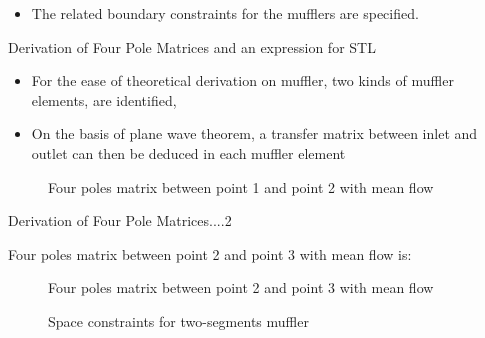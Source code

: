\documentclass{beamer}
\begin{document}
\begin{frame}{}

\begin{itemize}
  \item The related boundary constraints for the mufflers are specified.
\end{itemize}

\end{frame}
\begin{frame}{Derivation of Four Pole Matrices and an expression for STL}

\begin{itemize}
  \item For the ease of theoretical derivation on muffler, two kinds of muffler elements, are identified,\item On the basis of plane wave theorem, a transfer matrix between inlet and outlet can then be deduced in each muffler element
\end{itemize}
\vskip 0.1cm

\begin{figure}

\caption{\label{fig:your-figure5}Four poles matrix between point 1 and
point 2 with mean flow}
\end{figure}
\end{frame}

\begin{frame}{Derivation of Four Pole Matrices....2}

Four poles matrix between point 2 and point 3 with mean flow is:
\begin{figure}

\caption{\label{fig:your-figure6}Four poles matrix between point 2 and
point 3 with mean flow}
\end{figure}
\begin{figure}

\caption{\label{fig:your-figure7}Space constraints for two-segments muffler}
\end{figure}

\end{frame}
\end{document}
